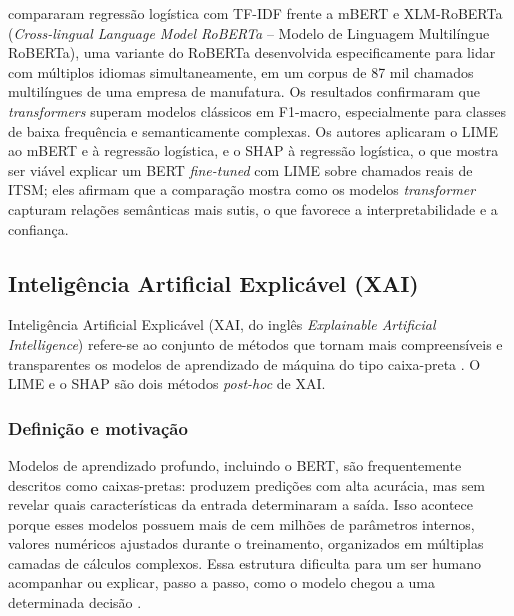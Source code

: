 \documentclass[
    12pt,                %
    openright,           %
    oneside,             %
    a4paper,             %
    english,             %
    brazil               %
]{abntex2}
\begin{document}
 compararam regressão logística com TF-IDF 
frente a mBERT e XLM-RoBERTa (\textit{Cross-lingual Language Model RoBERTa} -- Modelo de Linguagem Multilíngue RoBERTa), uma variante do RoBERTa desenvolvida 
especificamente para lidar com múltiplos idiomas simultaneamente, 
em um corpus de 87 mil chamados multilíngues de uma empresa 
de manufatura. Os resultados confirmaram que \textit{transformers} 
superam modelos clássicos em F1-macro, especialmente para classes 
de baixa frequência e semanticamente complexas. Os autores aplicaram o LIME ao mBERT e à regressão logística, e o SHAP à regressão logística, o que mostra ser viável explicar um BERT \textit{fine-tuned} com LIME sobre chamados reais de ITSM; eles afirmam que a comparação mostra como os modelos \textit{transformer} capturam relações semânticas mais sutis, o que favorece a interpretabilidade e a confiança.

\subsection{Inteligência Artificial Explicável (XAI)}

Inteligência Artificial Explicável (XAI, do inglês \textit{Explainable Artificial Intelligence}) refere-se ao conjunto de métodos que tornam mais compreensíveis e transparentes os modelos de aprendizado de máquina do tipo caixa-preta \cite{salih2023}. O LIME \cite{ribeiro2016} e o SHAP \cite{lundberg2017} são dois métodos \textit{post-hoc} de XAI.

\subsubsection{Definição e motivação}
\label{subsec:xai_definicao}

\label{subsubsec:xai_caixapreta}

Modelos de aprendizado profundo, incluindo o BERT, são frequentemente descritos como caixas-pretas: produzem predições com alta acurácia, mas sem revelar quais características da entrada determinaram a saída. Isso acontece porque esses modelos possuem mais de cem milhões de 
parâmetros internos, valores numéricos ajustados durante o 
treinamento, organizados em múltiplas camadas de cálculos complexos. Essa estrutura dificulta para um ser humano acompanhar ou explicar, passo a passo, como o modelo chegou a uma determinada decisão \cite{salih2023}.
\end{document}
